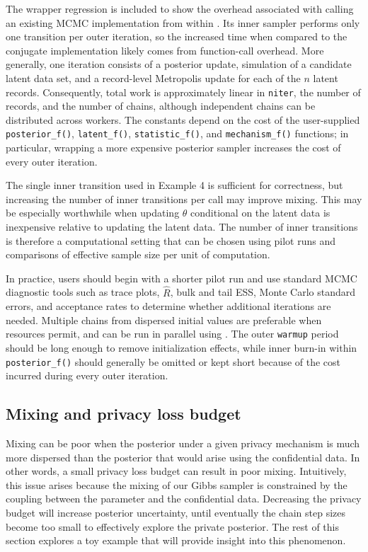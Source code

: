 The wrapper regression is included to show the overhead associated with calling
an existing MCMC implementation from within . Its inner sampler
performs only one transition per outer iteration, so the increased time when compared
to the conjugate implementation likely
comes from function-call overhead.
More generally, one  iteration consists of a posterior update, simulation of a
candidate latent data set, and a record-level Metropolis update for each of the
\(n\) latent records. Consequently, total work is approximately linear in
\texttt{niter}, the number of records, and the number of chains, although independent
chains can be distributed across workers. The constants depend on the cost of
the user-supplied \texttt{posterior\_f()}, \texttt{latent\_f()}, \texttt{statistic\_f()}, and
\texttt{mechanism\_f()} functions; in particular, wrapping a more expensive posterior
sampler increases the cost of every outer iteration.

The single inner transition used in Example 4 is sufficient for correctness,
but increasing the number of inner transitions per call may improve mixing.
This may be especially worthwhile when updating \(\theta\) conditional on the
latent data is inexpensive relative to updating the latent data. The number of
inner transitions is therefore a computational setting that can be chosen using
pilot runs and comparisons of effective sample size per unit of computation.

In practice, users should begin with a shorter pilot run and use
standard MCMC diagnostic tools such as trace plots,
\(\widehat{R}\), bulk and tail ESS, Monte Carlo standard errors, and acceptance
rates to determine whether additional iterations are needed. Multiple chains
from dispersed initial values are preferable when resources permit, and can be
run in parallel using . The outer \texttt{warmup} period should be long
enough to remove initialization effects, while inner burn-in within \texttt{posterior\_f()}
should generally be omitted or kept short because of the cost incurred during every outer iteration.

\subsection{Mixing and privacy loss budget}\label{sec:mixing}

Mixing can be poor when the posterior under a given privacy mechanism is much
more dispersed than the posterior that would arise using the confidential data. In
other words, a small privacy loss budget can result in poor mixing. Intuitively,
this issue arises because the mixing of our Gibbs sampler is constrained by the
coupling between the parameter and the confidential data. Decreasing the privacy
budget will increase posterior uncertainty, until eventually the chain step
sizes become too small to effectively explore the private posterior.
The rest of this section explores a toy example that will provide insight into this
phenomenon.

